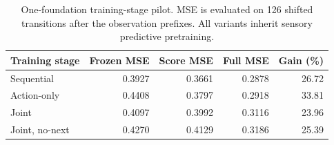 \begin{table}[tbp]
\centering\small
\caption{One-foundation training-stage pilot. MSE is evaluated on 126 shifted transitions after the observation prefixes. All variants inherit sensory predictive pretraining.}
\label{tab:bridge}
\begin{tabular}{@{}lrrrr@{}}
\toprule
Training stage & Frozen MSE & Score MSE & Full MSE & Gain (\%) \\
\midrule
Sequential & 0.3927 & 0.3661 & 0.2878 & 26.72 \\
Action-only & 0.4408 & 0.3797 & 0.2918 & 33.81 \\
Joint & 0.4097 & 0.3992 & 0.3116 & 23.96 \\
Joint, no-next & 0.4270 & 0.4129 & 0.3186 & 25.39 \\
\bottomrule
\end{tabular}
\end{table}
